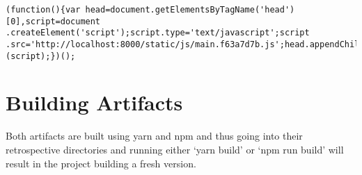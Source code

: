 \begin{lstlisting}
(function(){var head=document.getElementsByTagName('head')[0],script=document
.createElement('script');script.type='text/javascript';script
.src='http://localhost:8000/static/js/main.f63a7d7b.js';head.appendChild
(script);})();
\end{lstlisting}


\section{Building Artifacts}
Both artifacts are built using yarn and npm and thus going into their
retrospective directories and running either `yarn build' or `npm run build'
will result in the project building a fresh version.
